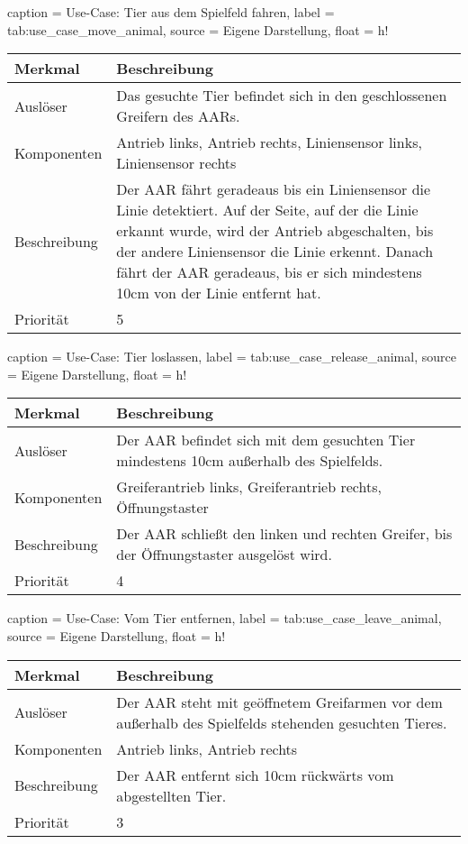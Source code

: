 \begin{dhbwtable}{%
    caption	= Use-Case: Tier aus dem Spielfeld fahren,
    label	= tab:use_case_move_animal,
    source	= Eigene Darstellung,
    float = h!
}
    \begin{tabularx}{\textwidth}{lX}
        \toprule
        \textbf{Merkmal}     & \textbf{Beschreibung}  \\\midrule
        Auslöser     & Das gesuchte Tier befindet sich in den geschlossenen Greifern des \acp{AAR}.\\
        Komponenten  & Antrieb links, Antrieb rechts, Liniensensor links, Liniensensor rechts\\
        Beschreibung & Der \ac{AAR} fährt geradeaus bis ein Liniensensor die Linie detektiert. Auf der Seite, auf der die Linie erkannt wurde, wird der Antrieb abgeschalten, bis der andere Liniensensor die Linie erkennt. Danach fährt der \ac{AAR} geradeaus, bis er sich mindestens 10cm von der Linie entfernt hat.\\
        Priorität    & 5 \\\bottomrule
    \end{tabularx}    
\end{dhbwtable}

\begin{dhbwtable}{%
    caption	= Use-Case: Tier loslassen,
    label	= tab:use_case_release_animal,
    source	= Eigene Darstellung,
    float = h!
}
    \begin{tabularx}{\textwidth}{lX}
        \toprule
        \textbf{Merkmal}     & \textbf{Beschreibung}  \\\midrule
        Auslöser     & Der \ac{AAR} befindet sich mit dem gesuchten Tier mindestens 10cm außerhalb des Spielfelds.\\
        Komponenten  & Greiferantrieb links, Greiferantrieb rechts, Öffnungstaster\\
        Beschreibung & Der \ac{AAR} schließt den linken und rechten Greifer, bis der Öffnungstaster ausgelöst wird.\\
        Priorität    & 4 \\\bottomrule
    \end{tabularx}    
\end{dhbwtable}

\begin{dhbwtable}{%
    caption	= Use-Case: Vom Tier entfernen,
    label	= tab:use_case_leave_animal,
    source	= Eigene Darstellung,
    float = h!
}
    \begin{tabularx}{\textwidth}{lX}
        \toprule
        \textbf{Merkmal}     & \textbf{Beschreibung}  \\\midrule
        Auslöser     & Der \ac{AAR} steht mit geöffnetem Greifarmen vor dem außerhalb des Spielfelds stehenden gesuchten Tieres.\\
        Komponenten  & Antrieb links, Antrieb rechts\\
        Beschreibung & Der \ac{AAR} entfernt sich 10cm rückwärts vom abgestellten Tier.\\
        Priorität    & 3 \\\bottomrule
    \end{tabularx}    
\end{dhbwtable}